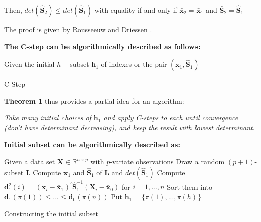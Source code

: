 \documentclass[review]{elsarticle}
\begin{document}
Then, $det(\boldsymbol{\hat{S}}_2) \leq det(\boldsymbol{\hat{S}}_1)$ with equality if and only if $\boldsymbol{\bar{x}}_2 = \boldsymbol{\bar{x}}_1$ and $\boldsymbol{\bar{S}}_2 = \boldsymbol{\hat{S}}_1$

The proof is given by Rousseeuw and Driessen \cite{rousseeuw1999fast}.
	
\textbf{The C-step can be algorithmically described as follows:}
\begin{algorithm}[H]\label{alg:alg01}
	\scriptsize
	\SetAlgoLined
	Given the initial $h-$subset $\boldsymbol{h}_1$ of indexes or the pair $(\boldsymbol{\bar{x}}_1, \boldsymbol{\hat{S}}_1)$\;
	\caption{C-Step}
\end{algorithm}

\textbf{Theorem 1} thus provides a partial idea for an algorithm: 

\textit{Take many initial choices of $\boldsymbol{h}_1$ and apply C-steps to each until convergence (don't have determinant decreasing), and keep the result with lowest determinant}.

\textbf{Initial subset can be algorithmically described as:}
\begin{algorithm}[H]\label{alg:alg02}
	\scriptsize
	\SetAlgoLined
	Given a data set $\boldsymbol{X} \in \mathbb{R}^{n \times p}$ with $p$-variate observations\;
	Draw a random $(p + 1)$-subset $\boldsymbol{L}$\;
	Compute $\boldsymbol{\bar{x}}_1$ and $\boldsymbol{\hat{S}}_1$ of $\boldsymbol{L}$ and $det(\boldsymbol{\hat{S}}_1)$\;
	Compute $\boldsymbol{d}_1^2(i) = (\boldsymbol{x}_i - \boldsymbol{\bar{x}}_1)^\prime \boldsymbol{\hat{S}}_1^{-1}(\boldsymbol{X}_i - \boldsymbol{\bar{x}}_0)$ for $i = 1, ..., n$\;
	Sort them into $\boldsymbol{d}_1(\pi(1)) \leq ... \leq \boldsymbol{d}_0(\pi(n))$\;
	Put $\boldsymbol{h}_1 = \{\pi(1), ..., \pi(h)\}$\;
	\caption{Constructing the initial subset}
\end{algorithm}
\end{document}
